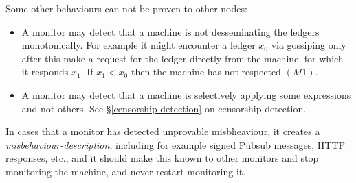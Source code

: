 \documentclass[a4paper, oneside, 10pt]{amsart}
\begin{document}
Some other behaviours can not be proven to other nodes:
\begin{itemize}
\item
  A monitor may detect that a machine is not desseminating the ledgers
  monotonically. For example it might encounter a ledger $x_0$ via gossiping
  only after this make a request for the ledger directly from the machine, for
  which it responds $x_1$. If $x_1 < x_0$ then the machine has not respected
  $(M1)$.
\item
  A monitor may detect that a machine is selectively applying some expressions
  and not others. See \S\ref{censorship-detection} on censorship detection.
\end{itemize}
In cases that a monitor has detected unprovable misbheaviour, it creates a
\emph{misbehaviour-description}, including for example signed Pubsub messages,
HTTP responses, etc., and it should make this known to other monitors and stop
monitoring the machine, and never restart monitoring it.
\end{document}
